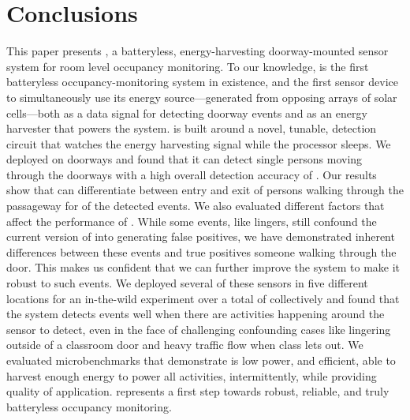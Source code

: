 \section{Conclusions}
\label{sec:conclusions}

This paper presents \sysname, a batteryless, energy-harvesting doorway-mounted sensor system for room level occupancy monitoring.
To our knowledge, \sysname is the first batteryless occupancy-monitoring system in existence, and the first sensor device to simultaneously use its energy source---generated from opposing arrays of solar cells---both as a data signal for detecting doorway events and as an energy harvester that powers the system.
\sysname is built around a novel, tunable, detection circuit that watches the energy harvesting signal while the processor sleeps.
We deployed \sysname on \numDoors doorways and found that it can detect single persons moving through the doorways with a high overall detection accuracy of \SysAccuracy. Our results show that \sysname can differentiate between entry and exit of persons walking through the passageway for \dirAccuracy of the detected events.
We also evaluated different factors that affect the performance of \sysname.  
While some events, like lingers, still confound the current version of \sysname into generating false positives, we have demonstrated inherent differences between these events and true positives \ie someone walking through the door.
This makes us confident that we can further improve the \sysname system to make it robust to such events.
We deployed several of these sensors in five different locations for an in-the-wild experiment over a total of \ITWdays collectively and found that the system detects events well when there are activities happening around the sensor to detect, even in the face of challenging confounding cases like lingering outside of a classroom door and heavy traffic flow when class lets out.
We evaluated \sysname microbenchmarks that demonstrate \sysname is low power, and efficient, able to harvest enough energy to power all activities, intermittently, while providing quality of application.
\sysname represents a first step towards robust, reliable, and truly batteryless occupancy monitoring.
